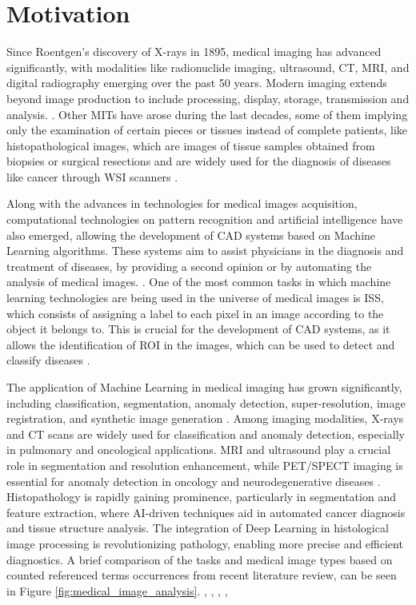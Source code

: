 \section{Motivation}\label{sec:motivation}

Since Roentgen’s discovery of X-rays in 1895, medical imaging has
advanced significantly, with modalities like radionuclide imaging,
ultrasound, \gls{CT}, \gls{MRI}, and digital radiography emerging over the past
50 years. Modern imaging extends beyond image production to include
processing, display, storage, transmission and analysis.
\cite{Zhou2021}.
Other \gls{MITs} have arose during the last decades, some of them
implying only the examination of certain pieces or tissues
instead of complete patients, like histopathological images, which
are images of tissue samples obtained from biopsies or surgical
resections and are widely used for the diagnosis of diseases like
cancer through \gls{WSI} scanners \cite{Rashmi2021}.

Along with the advances in technologies for medical images acquisition,
computational technologies on pattern recognition and artificial intelligence
have also emerged, allowing the development of \gls{CAD} systems based on
Machine Learning algorithms. These systems aim to assist physicians
in the diagnosis and treatment of diseases, by providing a second
opinion or by automating the analysis of medical images.
\cite{Panayides2020}. One of the most common tasks in which machine
learning technologies are being used in the universe of medical images
is \gls{ISS}, which consists of assigning a label to each pixel in an image
according to the object it belongs to. This is crucial for the development
of \gls{CAD} systems, as it allows the identification of \gls{ROI} in
the images, which can be used to detect and classify diseases
\cite{Azad2024}.

The application of Machine Learning in medical imaging has grown
significantly, including classification, segmentation,
anomaly detection, super-resolution, image registration, and
synthetic image generation \cite{BritoPacheco2025}. Among imaging
modalities, X-rays and \gls{CT} scans are widely used for classification
and anomaly detection, especially in pulmonary and oncological
applications. \gls{MRI} and ultrasound play a crucial role in segmentation
and resolution enhancement, while PET/SPECT imaging is essential for
anomaly detection in oncology and neurodegenerative diseases
\cite{BritoPacheco2025}.
Histopathology is rapidly gaining prominence, particularly in segmentation and
feature extraction, where AI-driven techniques aid in automated
cancer diagnosis and tissue structure analysis. The integration of
Deep Learning in histological image processing is revolutionizing
pathology, enabling more precise and efficient diagnostics. A brief
comparison of the tasks and medical image types
based on counted referenced terms occurrences from recent literature
review, can be seen in Figure \ref{fig:medical_image_analysis}.
\cite{YuEtAl2025}, \cite{BritoPacheco2025}, \cite{RyouEtAl2025},
\cite{DingyiEtAl2025}, \cite{BehnazEtAl2025}

